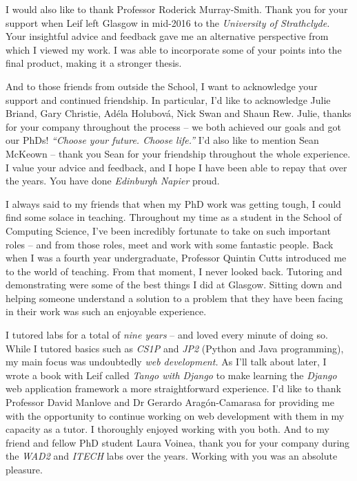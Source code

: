 \begin{preamble}
I would also like to thank Professor Roderick Murray-Smith. Thank you for your support when Leif left Glasgow in mid-2016 to the \emph{University of Strathclyde.} Your insightful advice and feedback gave me an alternative perspective from which I viewed my work. I was able to incorporate some of your points into the final product, making it a stronger thesis.

And to those friends from outside the School, I want to acknowledge your support and continued friendship. In particular, I'd like to acknowledge Julie Briand, Gary Christie, Ad\'{e}la Holubov\'{a}, Nick Swan and Shaun Rew. Julie, thanks for your company throughout the process -- we both achieved our goals and got our PhDs! \emph{``Choose your future. Choose life.''} I'd also like to mention Sean McKeown -- thank you Sean for your friendship throughout the whole experience. I value your advice and feedback, and I hope I have been able to repay that over the years. You have done \emph{Edinburgh Napier} proud.

I always said to my friends that when my PhD work was getting tough, I could find some solace in teaching. Throughout my time as a student in the School of Computing Science, I've been incredibly fortunate to take on such important roles -- and from those roles, meet and work with some fantastic people. Back when I was a fourth year undergraduate, Professor Quintin Cutts introduced me to the world of teaching. From that moment, I never looked back. Tutoring and demonstrating were some of the best things I did at Glasgow. Sitting down and helping someone understand a solution to a problem that they have been facing in their work was such an enjoyable experience.

I tutored labs for a total of \emph{nine years} -- and loved every minute of doing so. While I tutored basics such as \emph{CS1P} and \emph{JP2} (Python and Java programming), my main focus was undoubtedly \emph{web development.} As I'll talk about later, I wrote a book with Leif called \emph{Tango with Django} to make learning the \emph{Django} web application framework a more straightforward experience. I'd like to thank Professor David Manlove and Dr Gerardo Arag\'{o}n-Camarasa for providing me with the opportunity to continue working on web development with them in my capacity as a tutor. I thoroughly enjoyed working with you both. And to my friend and fellow PhD student Laura Voinea, thank you for your company during the \emph{WAD2} and \emph{ITECH} labs over the years. Working with you was an absolute pleasure.


\end{preamble}
